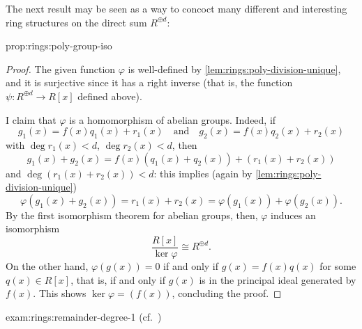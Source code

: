 The next result may be seen as a way to concoct many different and
interesting ring structures on the direct sum $R^{\oplus d}$:

\begin{prop}{}{prop:rings:poly-group-iso}
\end{prop}
\begin{proof}
  The given function $\varphi$ is well-defined by
  \cref{lem:rings:poly-division-unique}, and it is surjective since it
  has a right inverse (that is, the function
  $\psi : R^{\oplus d} \to R[x]$ defined above).

  I claim that $\varphi$ is a homomorphism of abelian groups. Indeed,
  if
  \[
    g_1(x) = f(x)q_1(x) + r_1(x) \quad \text{and} \quad g_2(x) =
    f(x)q_2(x) + r_2(x)
  \]
  with $\deg r_1(x) < d$, $\deg r_2(x) < d$, then
  \[
    g_1(x) + g_2(x) = f(x)(q_1(x) + q_2(x)) + (r_1(x) + r_2(x))
  \]
  and $\deg(r_1(x) + r_2(x)) < d$: this implies (again by
  \cref{lem:rings:poly-division-unique})
  \[
    \varphi(g_1(x) + g_2(x)) = r_1(x) + r_2(x) = \varphi(g_1(x)) +
    \varphi(g_2(x)).
  \]
  By the first isomorphism theorem for abelian groups, then, $\varphi$
  induces an isomorphism
  \[
    \frac{R[x]}{\ker\varphi} \cong R^{\oplus d}.
  \]
  On the other hand, $\varphi(g(x)) = 0$ if and only if
  $g(x) = f(x)q(x)$ for some $q(x) \in R[x]$, that is, if and only if
  $g(x)$ is in the principal ideal generated by $f(x)$. This shows
  $\ker\varphi = (f(x))$, concluding the proof.
\end{proof}

\begin{exam}{}{exam:rings:remainder-degree-1}
   (cf.\ )

\end{exam}

